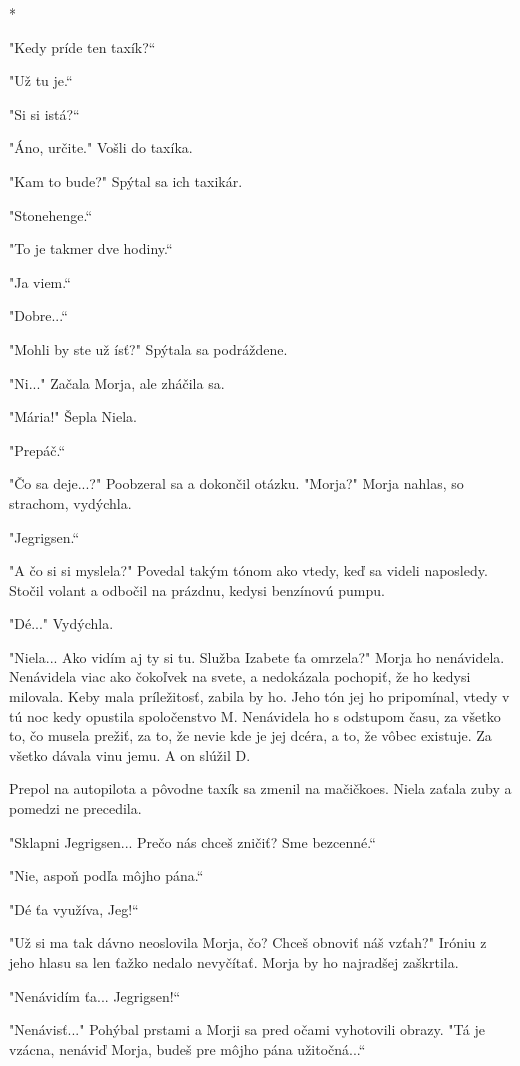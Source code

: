\documentclass{book}
\begin{document}
\begin{center}
*
\end{center}

"Kedy príde ten taxík?“

"$ $Už tu je.“

"Si si istá?“

"Áno, určite."$ $ Vošli do taxíka.

"Kam to bude?"$ $ Spýtal sa ich taxikár.

"Stonehenge.“

"To je takmer dve hodiny.“

"Ja viem.“

"Dobre...“

"Mohli by ste už ísť?"$ $ Spýtala sa podráždene.

"Ni..."$ $ Začala Morja, ale zháčila sa.

"Mária!"$ $ Šepla Niela.

"Prepáč.“

"Čo sa deje...?"$ $ Poobzeral sa a dokončil otázku. "Morja?"$ $ Morja nahlas, so 
strachom, vydýchla.

"Jegrigsen.“

"$ $A čo si si myslela?"$ $ Povedal takým tónom ako vtedy, keď sa videli naposledy. Stočil volant a odbočil na prázdnu, kedysi benzínovú pumpu.

"Dé..."$ $ Vydýchla.

"Niela... Ako vidím aj ty si tu. Služba Izabete ťa omrzela?"$ $ Morja ho nenávidela. Nenávidela viac ako čokoľvek na svete, a nedokázala pochopiť, že ho kedysi milovala. Keby mala príležitosť, zabila by ho. Jeho tón jej ho pripomínal, vtedy v tú noc kedy opustila spoločenstvo M. Nenávidela ho s odstupom času, za všetko to, čo musela prežiť, za to, že nevie kde je jej dcéra, a to, že vôbec existuje. Za všetko dávala vinu jemu. A on slúžil D.

Prepol na autopilota a pôvodne taxík sa zmenil na mačičkoes. Niela zaťala zuby a pomedzi ne precedila.

"Sklapni Jegrigsen... Prečo nás chceš zničiť? Sme bezcenné.“

"Nie, aspoň podľa môjho pána.“

"Dé ťa využíva, Jeg!“

"$ $Už si ma tak dávno neoslovila Morja, čo? Chceš obnoviť náš vzťah?"$ $ Iróniu z jeho hlasu sa len ťažko nedalo nevyčítať. Morja by ho najradšej zaškrtila.

"Nenávidím ťa... Jegrigsen!“

"Nenávisť..."$ $ Pohýbal prstami a Morji sa pred očami vyhotovili obrazy. "Tá je vzácna, nenáviď Morja, budeš pre môjho pána užitočná...“
\end{document}
